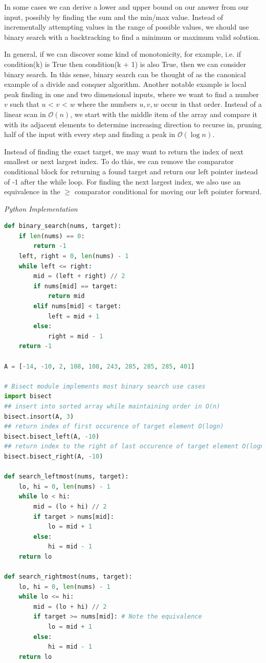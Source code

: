 \documentclass{article}
\newcommand{\bigO}{\mathcal{O}}
\begin{document}
    In some cases we can derive a lower and upper bound on our answer from our input, possibly by finding the sum and the min/max value. Instead of incrementally attempting values in the range of possible values, we should use binary search with a backtracking to find a minimum or maximum valid solution.
    
    In general, if we can discover some kind of monotonicity, for example, i.e. if condition(k) is True then condition(k + 1) is also True, then we can consider binary search. In this sense, binary search can be thought of as the canonical example of a divide and conquer algorithm. Another notable example is local peak finding in one and two dimensional inputs, where we want to find a number $v$ such that $u$ < $v$ < $w$ where the numbers $u,v,w$ occur in that order. Instead of a linear scan in $\bigO(n)$, we start with the middle item of the array and compare it with its adjacent elements to determine increasing direction to recurse in, pruning half of the input with every step and finding a peak in $\bigO(\log n)$.
    
    Instead of finding the exact target, we may want to return the index of next smallest or next largest index. To do this, we can remove the comparator conditional block for returning a found target and return our left pointer instead of -1 after the while loop. For finding the next largest index, we also use an equivalence in the $\geq$ comparator conditional for moving our left pointer forward.
    
\vspace{8pt} \emph{Python Implementation}
\begin{lstlisting}[language=Python]
def binary_search(nums, target):
    if len(nums) == 0:
        return -1
    left, right = 0, len(nums) - 1
    while left <= right:
        mid = (left + right) // 2
        if nums[mid] == target:
            return mid
        elif nums[mid] < target:
            left = mid + 1
        else:
            right = mid - 1
    return -1

A = [-14, -10, 2, 108, 108, 243, 285, 285, 285, 401]

# Bisect module implements most binary search use cases
import bisect
## insert into sorted array while maintaining order in O(n)
bisect.insort(A, 3)
## return index of first occurence of target element O(logn)
bisect.bisect_left(A, -10)
## return index to the right of last occurence of target element O(logn)
bisect.bisect_right(A, -10)

def search_leftmost(nums, target):
    lo, hi = 0, len(nums) - 1
    while lo < hi:
        mid = (lo + hi) // 2
        if target > nums[mid]:
            lo = mid + 1
        else:
            hi = mid - 1
    return lo
    
def search_rightmost(nums, target):
    lo, hi = 0, len(nums) - 1
    while lo <= hi:
        mid = (lo + hi) // 2
        if target >= nums[mid]: # Note the equivalence
            lo = mid + 1
        else:
            hi = mid - 1
    return lo 
\end{lstlisting}
    
\end{document}

